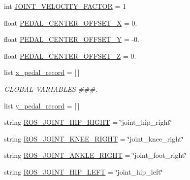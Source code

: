 \begin{DoxyCompactItemize}
\item 
int \mbox{\hyperlink{namespacepedal__simulation__old__trajectory_a3b3a8a93ee2f20ed619f10c47e9b1a04}{J\+O\+I\+N\+T\+\_\+\+V\+E\+L\+O\+C\+I\+T\+Y\+\_\+\+F\+A\+C\+T\+OR}} = 1
\item 
float \mbox{\hyperlink{namespacepedal__simulation__old__trajectory_a6c87ec0d298041e7cb7ea943a6bf398b}{P\+E\+D\+A\+L\+\_\+\+C\+E\+N\+T\+E\+R\+\_\+\+O\+F\+F\+S\+E\+T\+\_\+X}} = 0.
\item 
float \mbox{\hyperlink{namespacepedal__simulation__old__trajectory_a58ffbb5fed01474f7281023c7e162254}{P\+E\+D\+A\+L\+\_\+\+C\+E\+N\+T\+E\+R\+\_\+\+O\+F\+F\+S\+E\+T\+\_\+Y}} = -\/0.
\item 
float \mbox{\hyperlink{namespacepedal__simulation__old__trajectory_aee9828eadffc313395ff5a1d89d09b9c}{P\+E\+D\+A\+L\+\_\+\+C\+E\+N\+T\+E\+R\+\_\+\+O\+F\+F\+S\+E\+T\+\_\+Z}} = 0.
\item 
list \mbox{\hyperlink{namespacepedal__simulation__old__trajectory_aa8cd607489437e30a21b5750a89b6c01}{x\+\_\+pedal\+\_\+record}} = \mbox{[}$\,$\mbox{]}
\begin{DoxyCompactList}\small\item\em G\+L\+O\+B\+AL V\+A\+R\+I\+A\+B\+L\+ES \#\#\#. \end{DoxyCompactList}\item 
list \mbox{\hyperlink{namespacepedal__simulation__old__trajectory_adf71bd769453a1f6abba83f43704e1a5}{y\+\_\+pedal\+\_\+record}} = \mbox{[}$\,$\mbox{]}
\item 
string \mbox{\hyperlink{namespacepedal__simulation__old__trajectory_a26b63f26314251c13665b59b4fdf6039}{R\+O\+S\+\_\+\+J\+O\+I\+N\+T\+\_\+\+H\+I\+P\+\_\+\+R\+I\+G\+HT}} = \char`\"{}joint\+\_\+hip\+\_\+right\char`\"{}
\item 
string \mbox{\hyperlink{namespacepedal__simulation__old__trajectory_ab44d0e07332be0873ea349a0afc28dca}{R\+O\+S\+\_\+\+J\+O\+I\+N\+T\+\_\+\+K\+N\+E\+E\+\_\+\+R\+I\+G\+HT}} = \char`\"{}joint\+\_\+knee\+\_\+right\char`\"{}
\item 
string \mbox{\hyperlink{namespacepedal__simulation__old__trajectory_ac5f2f527231276de514a57ca4ff4f216}{R\+O\+S\+\_\+\+J\+O\+I\+N\+T\+\_\+\+A\+N\+K\+L\+E\+\_\+\+R\+I\+G\+HT}} = \char`\"{}joint\+\_\+foot\+\_\+right\char`\"{}
\item 
string \mbox{\hyperlink{namespacepedal__simulation__old__trajectory_afd61b2f3f5771c1e8abfba1f255fb729}{R\+O\+S\+\_\+\+J\+O\+I\+N\+T\+\_\+\+H\+I\+P\+\_\+\+L\+E\+FT}} = \char`\"{}joint\+\_\+hip\+\_\+left\char`\"{}
\item 

\end{DoxyCompactItemize}
